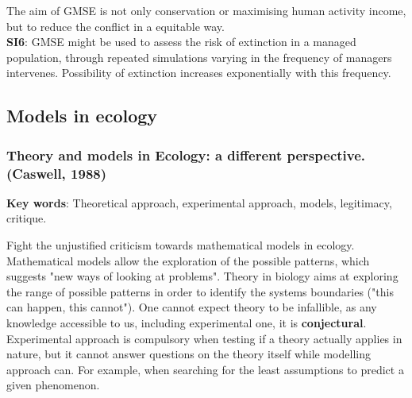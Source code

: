 \documentclass[12pt]{article}
\begin{document}
The aim of GMSE is not only conservation or maximising human activity income, but to reduce the conflict in a equitable way.\\

\textbf{SI6}: GMSE  might  be  used  to  assess  the  risk  of  extinction  in  a  managed  population, through repeated simulations varying in the frequency of managers intervenes. Possibility of extinction increases exponentially with this frequency.

\subsection{Models in ecology}

\subsubsection{Theory and models in Ecology: a different perspective. (Caswell, 1988)}
\textbf{Key words}: Theoretical approach, experimental approach, models, legitimacy, critique.

Fight the unjustified criticism towards mathematical models in ecology.
Mathematical models allow the exploration of the possible patterns, which suggests "new ways of looking at problems".
Theory in biology aims at exploring the range of possible patterns in order to identify the systems boundaries ("this can happen, this cannot").
One cannot expect theory to be infallible, as any knowledge accessible to us, including experimental one, it is \textbf{conjectural}. 
Experimental approach is compulsory when testing if a theory actually applies in nature, but it cannot answer questions on the theory itself while modelling approach can. For example, when searching for the least assumptions to predict a given phenomenon.
\end{document}

